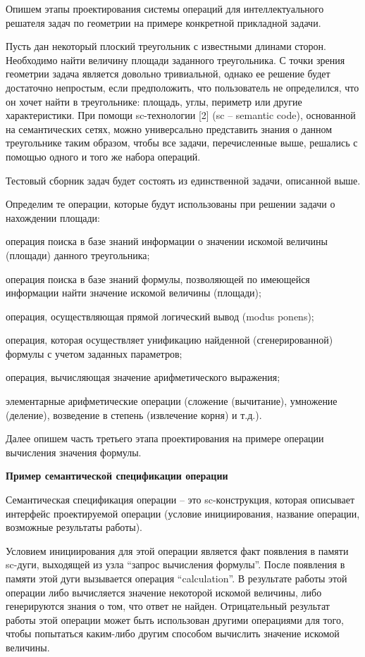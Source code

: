 Опишем этапы проектирования системы операций для интеллектуального решателя задач по геометрии на примере конкретной прикладной задачи.

Пусть дан некоторый плоский треугольник с известными длинами сторон. Необходимо найти величину площади заданного треугольника. С точки зрения геометрии задача является довольно тривиальной, однако ее решение будет достаточно непростым, если предположить, что пользователь не определился, что он хочет найти в треугольнике: площадь, углы, периметр или другие характеристики. При помощи sc-технологии {[}2{]} (sc -- semantic code), основанной на семантических сетях, можно универсально представить знания о данном треугольнике таким образом, чтобы все задачи, перечисленные выше, решались с помощью одного и того же набора операций.

Тестовый сборник задач будет состоять из единственной задачи, описанной выше.

Определим те операции, которые будут использованы при решении задачи о нахождении площади:

\begin{textitemize}
	\item операция поиска в базе знаний информации о значении искомой величины (площади) данного треугольника;
	\item операция поиска в базе знаний формулы, позволяющей по имеющейся информации найти значение искомой величины (площади);
	\item операция, осуществляющая прямой логический вывод (modus ponens);
	\item операция, которая осуществляет унификацию найденной (сгенерированной) формулы с учетом заданных параметров;
	\item операция, вычисляющая значение арифметического выражения;
	\item элементарные арифметические операции (сложение (вычитание), умножение (деление), возведение в степень (извлечение корня) и т.д.).
\end{textitemize}

Далее опишем часть третьего этапа проектирования на примере операции вычисления значения формулы.

\textbf{Пример семантической спецификации операции}

Семантическая спецификация операции -- это sc-конструкция, которая описывает интерфейс проектируемой операции (условие инициирования, название операции, возможные результаты работы).

Условием инициирования для этой операции является факт появле­ния в памяти sc-дуги, выходящей из узла ``запрос вычисления формулы''. После появления в памяти этой дуги вызывается операция ``calculation''. В результате работы этой операции либо вычисляется значение некоторой искомой величины, либо генерируются знания о том, что ответ не найден. Отрицательный результат работы этой операции может быть использован другими операциями для того, чтобы попытать­ся каким-либо другим способом вычислить значение искомой величины.

